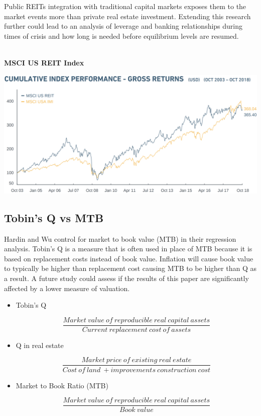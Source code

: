 \documentclass[a4paper, 12pt]{article} %
\begin{document}
Public REITs integration with traditional capital markets exposes them to the market events more than private real estate investment. Extending this research further could lead to an analysis of leverage and banking relationships during times of crisis and how long is needed before equilibrium levels are resumed. \\
\\
\begin{center}
\textbf{MSCI US REIT Index}

\includegraphics[width=1\textwidth]{msci.png}

\end{center}
\subsection*{Tobin's Q vs MTB}

Hardin and Wu control for market to book value (MTB) in their regression analysis. Tobin's Q is a measure that is often used in place of MTB because it is based on replacement costs instead of book value. Inflation will cause book value to typically be higher than replacement cost causing MTB to be higher than Q as a result. A future study could assess if the results of this paper are significantly affected by a lower measure of valuation.


\begin{itemize}


\item Tobin's Q

$$\frac{Market\: value\: of\: reproducible\: real \:capital\: assets}{Current \:replacement \:cost \:of \:assets}$$

\item Q in real estate

$$\frac{Market\: price\: of\: existing\: real\: estate}{Cost\: of\: land\: + improvements\: construction\: cost}$$

\item Market to Book Ratio (MTB) 

$$\frac{Market\: value\: of\: reproducible\: real \:capital\: assets}{Book\: value}$$

\end{itemize}
\end{document}
